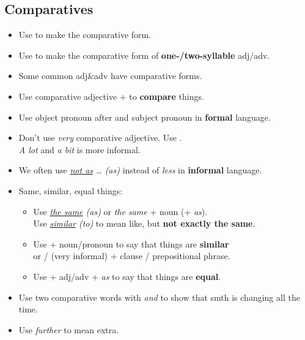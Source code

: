 \subsection{Comparatives}
\begin{itemize}
    \item Use  to make the comparative form.
    \item Use  to make the comparative form of \textbf{one-/two-syllable} adj/adv.
    \item Some common adj\&adv have  comparative forms.
    \item Use comparative adjective +  to \textbf{compare} things.
    \item[\doot] Use object pronoun after  and subject pronoun in \textbf{formal} language.
    \item Don't use \textit{very}  comparative adjective.
    Use .\\
    \textit{A lot} and \textit{a bit} is more informal.
    \item We often use \textit{\underline{not as} \ldots{} (as)} instead of \textit{less} in \textbf{informal} language.
    \item Same, similar, equal things:
    \begin{itemize}
        \item[\daash] Use \textit{\underline{the same} (as)} or \textit{the same} + noun (+ \textit{as}).\\
        Use \textit{\underline{similar} (to)} to mean like, but \textbf{not exactly the same}.
        \item[\daash] Use  + noun/pronoun to say that things are \textbf{similar}\\
        or  /  (very informal) + clause / prepositional phrase.
        \item Use  + adj/adv + \textit{as} to say that things are \textbf{equal}.
    \end{itemize}
    \item[\aast] Use two comparative words with \textit{and} to show that smth is changing all the time.
    \item[\aast] Use \textit{further} to mean extra.
\end{itemize}

